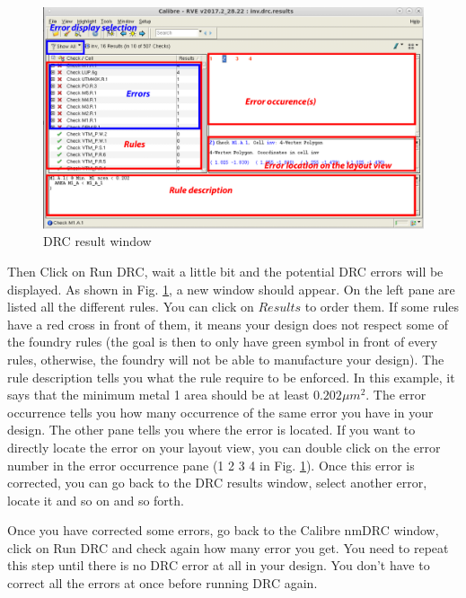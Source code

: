 \begin{enumerate}
\parbox[t]{\dimexpr\textwidth-\leftmargin}{%
	\begin{figure}
		\vspace{-0mm}
		\centering
		\vspace{-\baselineskip}
		\includegraphics[scale=0.28]{figures/lab2_layout/drc_verif.pdf}
\caption{DRC result window}
\label{fig_drcverif}
	\end{figure}
	\item Then Click on Run DRC, wait a little bit and the potential DRC errors will be displayed. As shown in Fig. \ref{fig_drcverif}, a new window should appear. On the left pane are listed all the different rules. You can click on $Results$ to order them. If some rules have a red cross in front of them, it means your design does not respect some of the foundry rules (the goal is then to only have green symbol in front of every rules, otherwise, the foundry will not be able to manufacture your design). The rule description tells you what the rule require to be enforced. In this example, it says that the minimum metal 1 area should be at least $0.202 \mu m^2$. The error occurrence tells you how many occurrence of the same error you have in your design. The other pane tells you where the error is located. If you want to directly locate the error on your layout view, you can double click on the error number in the error occurrence pane (1 2 3 4 in Fig. \ref{fig_drcverif}). Once this error is corrected, you can go back to the DRC results window, select another error, locate it and so on and so forth.\vspace{2mm}
}

	\item Once you have corrected some errors, go back to the Calibre nmDRC window, click on Run DRC and check again how many error you get. You need to repeat this step until there is no DRC error at all in your design. You don't have to correct all the errors at once before running DRC again. 
	

\end{enumerate}
